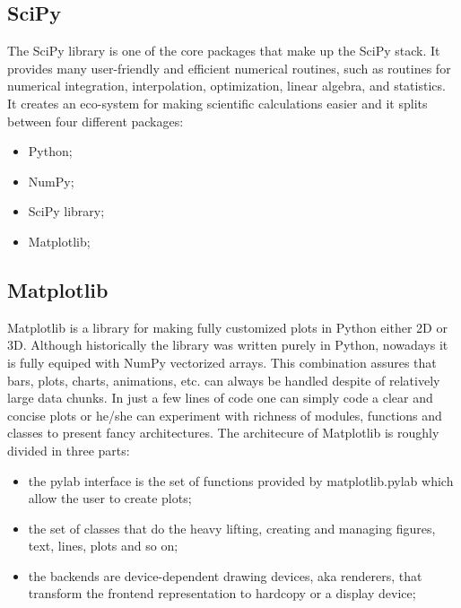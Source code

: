 \documentclass[a4paper,oneside,openright,11pt]{book}
\begin{document}
\subsection{SciPy}

The SciPy \cite{scp} library is one of the core packages that make up the SciPy stack. It provides many user-friendly and efficient numerical routines, such as routines for numerical integration, interpolation, optimization, linear algebra, and statistics. It creates an eco-system for making scientific calculations easier and it splits between four different packages:

\begin{itemize}
    \item Python;
    \item NumPy;
    \item SciPy library;
    \item Matplotlib;
\end{itemize}


\subsection{Matplotlib}

Matplotlib \cite{mpl} \cite{Hunter:2007} is a library for making fully customized plots in Python either 2D or 3D. Although historically the library was written purely in Python, nowadays it is fully equiped with NumPy vectorized arrays. This combination assures that bars, plots, charts, animations, etc. can always be handled despite of relatively large data chunks. In just a few lines of code one can simply code a clear and concise plots or he/she can experiment with richness of modules, functions and classes to present fancy architectures. The architecure of Matplotlib is roughly divided in three parts:

\begin{itemize}
    \item the pylab interface is the set of functions provided by matplotlib.pylab which allow the user to create plots;
    \item the set of classes that do the heavy lifting, creating and managing figures, text, lines, plots and so on;
    \item the backends are device-dependent drawing devices, aka renderers, that transform the frontend representation to hardcopy or a display device;
\end{itemize}
\end{document}
